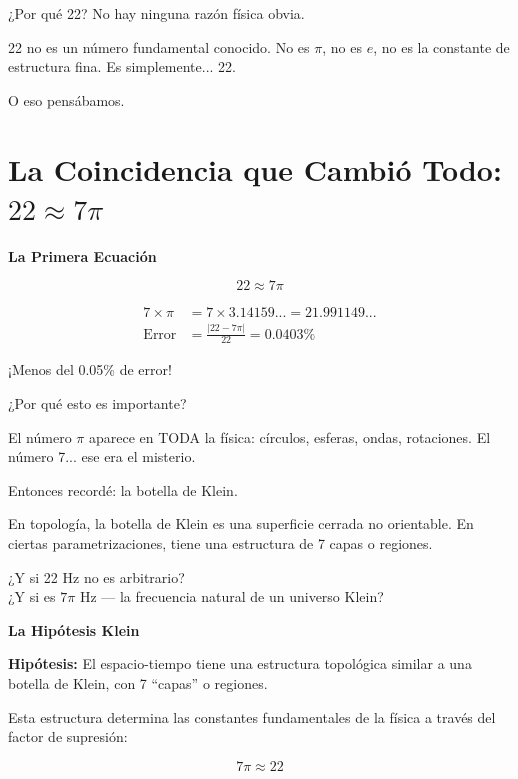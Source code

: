 ¿Por qué 22? No hay ninguna razón física obvia.

22 no es un número fundamental conocido. No es $\pi$, no es $e$, no es
la constante de estructura fina. Es simplemente... 22.

O eso pensábamos.


\section{La Coincidencia que Cambió Todo: $22 \approx 7\pi$}

\begin{nivelmatematico}
\textbf{La Primera Ecuación}

\begin{equation}
\boxed{22 \approx 7\pi}
\end{equation}

\begin{align}
7 \times \pi &= 7 \times 3.14159... = 21.991149...\\[0.3cm]
\text{Error} &= \frac{|22 - 7\pi|}{22} = 0.0403\%
\end{align}

¡Menos del 0.05\% de error!
\end{nivelmatematico}

¿Por qué esto es importante?

El número $\pi$ aparece en TODA la física: círculos, esferas, ondas, rotaciones.
El número 7... ese era el misterio.

Entonces recordé: la botella de Klein.

En topología, la botella de Klein es una superficie cerrada no orientable.
En ciertas parametrizaciones, tiene una estructura de 7 capas o regiones.

¿Y si 22 Hz no es arbitrario?\\
¿Y si es $7\pi$ Hz --- la frecuencia natural de un universo Klein?

\begin{nivelconceptual}
\textbf{La Hipótesis Klein}

\textbf{Hipótesis:} El espacio-tiempo tiene una estructura topológica
similar a una botella de Klein, con 7 ``capas'' o regiones.

Esta estructura determina las constantes fundamentales de la física
a través del factor de supresión:

\begin{equation}
\boxed{7\pi \approx 22}
\end{equation}
\end{nivelconceptual}


